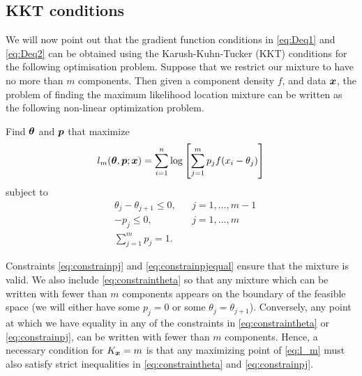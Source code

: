 	\subsection{KKT conditions}
	\label{sec:KKT conditions}
	We will now point out that the gradient function conditions in \eqref{eq:Deq1} and \eqref{eq:Deq2} can be obtained using the Karush-Kuhn-Tucker (KKT) conditions \cite{Kuhn1951-ih} \cite{Karush2014-vk} for the following optimisation problem. Suppose that we restrict our mixture to have no more than $m$ components. Then given a component density $f$, and data ${\bm{{x}}}$, the problem of finding the maximum likelihood location mixture can be written as the following non-linear optimization problem.

	Find ${\bm{{\theta}}}$ and ${\bm{{p}}}$ that maximize
	\begin{equation}
		l_m({\bm{{\theta}}},{\bm{{p}}};{\bm{{x}}}) = \sum_{i=1}^n \log \left[\sum_{j=1}^m p_j f(x_i - \theta_j) \right]
		\label{eq:l_m}
	\end{equation}
	subject to 
	\begin{align}
		&\theta_j -\theta_{j+1} \leq 0, &&j=1,\dots,m-1
		\label{eq:constraintheta}\\
		&-p_j \leq 0, &&j=1,\dots,m
		\label{eq:constrainpj}\\
		&\sum_{j=1}^m p_j = 1.
		\label{eq:constrainpjequal}
	\end{align}

	Constraints \eqref{eq:constrainpj} and \eqref{eq:constrainpjequal} ensure that the mixture is valid. We also include \eqref{eq:constraintheta} so that any mixture which can be written with fewer than $m$ components appears on the boundary of the feasible space (we will either have some $p_j = 0$ or some $\theta_j = \theta_{j+1}$). Conversely, any point at which we have equality in any of the constraints in \eqref{eq:constraintheta} or \eqref{eq:constrainpj}, can be written with fewer than $m$ components. Hence, a necessary condition for $K_{\bm{{x}}} = m$ is that any maximizing point of \eqref{eq:l_m} must also satisfy strict inequalities in \eqref{eq:constraintheta} and \eqref{eq:constrainpj}.

